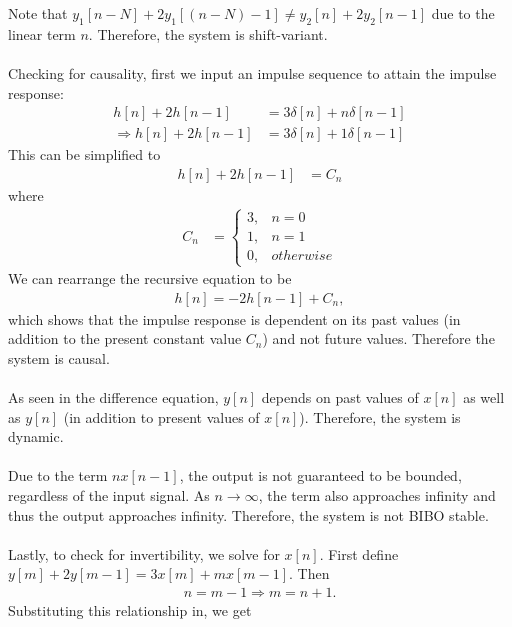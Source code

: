 \documentclass{report}
\begin{document}
\begin{solution}
    Note that $y_1[n-N] + 2y_1[(n-N)-1] \neq y_2[n] + 2y_2[n-1]$ due to the linear term $n$. Therefore, the system is shift-variant. 
    \\ \\
    Checking for causality, first we input an impulse sequence to attain the impulse response:
    \begin{align*}
        h[n] + 2h[n-1] &= 3\delta[n] + n\delta[n-1] \\
        \Longrightarrow h[n] + 2h[n-1] &= 3\delta[n] + 1\delta[n-1]
    \end{align*}
    This can be simplified to 
    \begin{align*}
        h[n] + 2h[n-1] &= C_n
    \end{align*}
    where
    \begin{align*}
        C_n &= \begin{cases}
            3, & n = 0 \\
            1, & n = 1 \\
            0, & otherwise
        \end{cases}
    \end{align*}
    We can rearrange the recursive equation to be  
    \begin{align*}
        h[n] = -2h[n-1] + C_n, 
    \end{align*}
    which shows that the impulse response is dependent on its past values (in addition to the present constant value $C_n$) and not future values. Therefore the system is causal. 
    \\ \\
    As seen in the difference equation, $y[n]$ depends on past values of $x[n]$ as well as $y[n]$ (in addition to present values of $x[n]$). Therefore, the system is dynamic.
    \\ \\
    Due to the term $nx[n-1]$, the output is not guaranteed to be bounded, regardless of the input signal. As $n\rightarrow\infty$, the term also approaches infinity and thus the output approaches infinity. 
    Therefore, the system is not BIBO stable.
    \\ \\
    Lastly, to check for invertibility, we solve for $x[n]$. First define $y[m] + 2y[m-1] = 3x[m] + mx[m-1]$. Then 
    \begin{align*}
        n=m-1 \Longrightarrow m=n+1.
    \end{align*}
    Substituting this relationship in, we get 
    \begin{align*}

\end{align*}
\end{solution}
\end{document}

